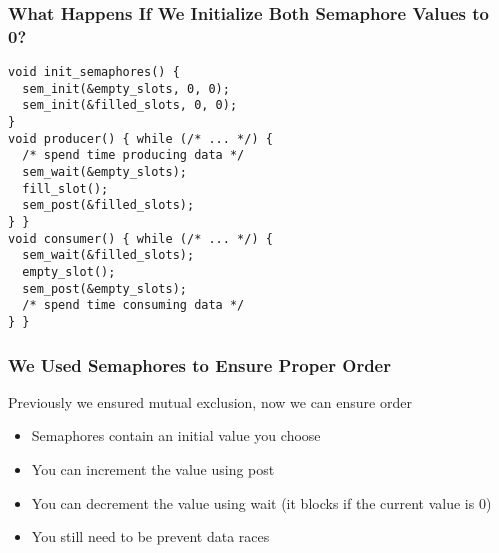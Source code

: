   \begin{frame}[fragile]
    \frametitle{What Happens If We Initialize Both Semaphore Values to 0?}

    \begin{lstlisting}
void init_semaphores() {
  sem_init(&empty_slots, 0, 0);
  sem_init(&filled_slots, 0, 0);
}
void producer() { while (/* ... */) {
  /* spend time producing data */
  sem_wait(&empty_slots);
  fill_slot();
  sem_post(&filled_slots);
} }
void consumer() { while (/* ... */) {
  sem_wait(&filled_slots);
  empty_slot();
  sem_post(&empty_slots);
  /* spend time consuming data */
} }
    \end{lstlisting}
  \end{frame}

  \begin{frame}
    \frametitle{We Used Semaphores to Ensure Proper Order}

    Previously we ensured mutual exclusion, now we can ensure order

    \begin{itemize}
      \item Semaphores contain an initial value you choose
      \item You can increment the value using post
      \item You can decrement the value using wait (it blocks if the current
            value is 0)
      \item You still need to be prevent data races
    \end{itemize}
  \end{frame}

